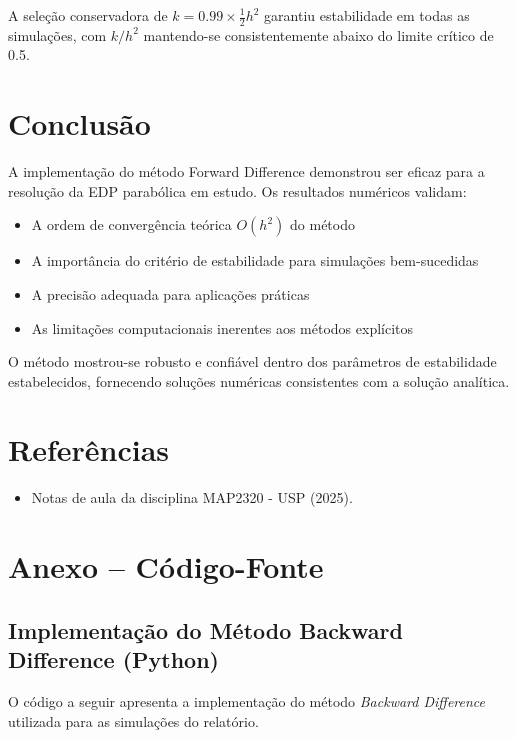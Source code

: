 \documentclass[10pt,twocolumn]{article}
\begin{document}
A seleção conservadora de $k = 0.99 \times \frac{1}{2}h^2$ garantiu estabilidade em todas as simulações, com $k/h^2$ mantendo-se consistentemente abaixo do limite crítico de 0.5.

\newpage
\section{Conclusão}

A implementação do método Forward Difference demonstrou ser eficaz para a resolução da EDP parabólica em estudo. Os resultados numéricos validam:

\begin{itemize}
    \item A ordem de convergência teórica $O(h^2)$ do método
    \item A importância do critério de estabilidade para simulações bem-sucedidas
    \item A precisão adequada para aplicações práticas
    \item As limitações computacionais inerentes aos métodos explícitos
\end{itemize}

O método mostrou-se robusto e confiável dentro dos parâmetros de estabilidade estabelecidos, fornecendo soluções numéricas consistentes com a solução analítica.

\section{Referências}
\begin{itemize}
  \item Notas de aula da disciplina MAP2320 - USP (2025).
\end{itemize}

\newpage
\appendix
\section*{Anexo – Código-Fonte}

\subsection*{Implementação do Método Backward Difference (Python)}

O código a seguir apresenta a implementação do método \textit{Backward Difference} utilizada para as simulações do relatório.
\end{document}
